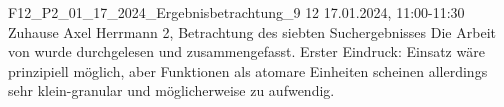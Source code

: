 \fieldnote
{F12\_P2\_01\_17\_2024\_Ergebnisbetrachtung\_9}
{12}
{17.01.2024, 11:00-11:30}
{Zuhause}
{Axel Herrmann}
{2, Betrachtung des siebten Suchergebnisses}
{
  Die Arbeit von  wurde durchgelesen und zusammengefasst.
}
{
}
{
  Erster Eindruck: Einsatz wäre prinzipiell möglich, aber
}
{
  Funktionen als atomare Einheiten scheinen allerdings sehr klein-granular und möglicherweise zu aufwendig.
}
{
}

